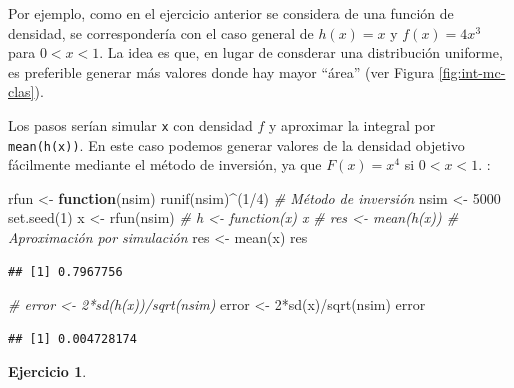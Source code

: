 \documentclass[
]{book}
\newenvironment{Shaded}{\begin{snugshade}}{\end{snugshade}}
\newcommand{\CommentTok}[1]{\textcolor[rgb]{0.56,0.35,0.01}{\textit{#1}}}
\newcommand{\ControlFlowTok}[1]{\textcolor[rgb]{0.13,0.29,0.53}{\textbf{#1}}}
\newcommand{\DecValTok}[1]{\textcolor[rgb]{0.00,0.00,0.81}{#1}}
\newcommand{\FunctionTok}[1]{\textcolor[rgb]{0.00,0.00,0.00}{#1}}
\newcommand{\NormalTok}[1]{#1}
\newcommand{\OtherTok}[1]{\textcolor[rgb]{0.56,0.35,0.01}{#1}}
\newcommand{\SpecialCharTok}[1]{\textcolor[rgb]{0.00,0.00,0.00}{#1}}
\theoremstyle{break}
\theoremstyle{definition}
\theoremstyle{definition}
\theoremstyle{definition}
\newtheorem{exercise}{Ejercicio}[chapter]
\theoremstyle{definition}
\theoremstyle{remark}
\begin{document}
Por ejemplo, como en el ejercicio anterior se considera de una función de densidad,
se correspondería con el caso general de \(h(x) = x\) y \(f(x) = 4x^3\) para \(0<x<1\).
La idea es que, en lugar de consderar una distribución uniforme,
es preferible generar más valores donde hay mayor ``área'' (ver Figura \ref{fig:int-mc-clas}).

Los pasos serían simular \texttt{x} con densidad \(f\) y aproximar la integral por \texttt{mean(h(x))}.
En este caso podemos generar valores de la densidad objetivo fácilmente mediante el método de inversión,
ya que \(F(x) = x^4\) si \(0<x<1\).
:

\begin{Shaded}
\begin{Highlighting}[]
\NormalTok{rfun }\OtherTok{\textless{}{-}} \ControlFlowTok{function}\NormalTok{(nsim) }\FunctionTok{runif}\NormalTok{(nsim)}\SpecialCharTok{\^{}}\NormalTok{(}\DecValTok{1}\SpecialCharTok{/}\DecValTok{4}\NormalTok{) }\CommentTok{\# Método de inversión}
\NormalTok{nsim }\OtherTok{\textless{}{-}} \DecValTok{5000}
\FunctionTok{set.seed}\NormalTok{(}\DecValTok{1}\NormalTok{)}
\NormalTok{x }\OtherTok{\textless{}{-}} \FunctionTok{rfun}\NormalTok{(nsim)}
\CommentTok{\# h \textless{}{-} function(x) x}
\CommentTok{\# res \textless{}{-} mean(h(x)) \# Aproximación por simulación }
\NormalTok{res }\OtherTok{\textless{}{-}} \FunctionTok{mean}\NormalTok{(x)}
\NormalTok{res}
\end{Highlighting}
\end{Shaded}

\begin{verbatim}
## [1] 0.7967756
\end{verbatim}

\begin{Shaded}
\begin{Highlighting}[]
\CommentTok{\# error \textless{}{-} 2*sd(h(x))/sqrt(nsim)}
\NormalTok{error }\OtherTok{\textless{}{-}} \DecValTok{2}\SpecialCharTok{*}\FunctionTok{sd}\NormalTok{(x)}\SpecialCharTok{/}\FunctionTok{sqrt}\NormalTok{(nsim)}
\NormalTok{error}
\end{Highlighting}
\end{Shaded}

\begin{verbatim}
## [1] 0.004728174
\end{verbatim}

\begin{exercise}
\protect\hypertarget{exr:mc-intinf}{}{\label{exr:mc-intinf} }
\end{exercise}
\end{document}
